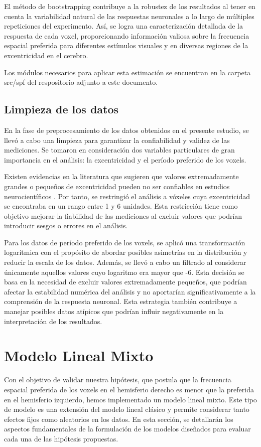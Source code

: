El método de bootstrapping contribuye a la robustez de los resultados al tener en cuenta la variabilidad natural de las respuestas neuronales a lo largo de múltiples repeticiones del experimento. Así, se logra una caracterización detallada de la respuesta de cada voxel, proporcionando información valiosa sobre la frecuencia espacial preferida para diferentes estímulos visuales y en diversas regiones de la excentricidad en el cerebro.

Los m\'odulos necesarios para aplicar esta estimaci\'on se encuentran en la carpeta src/spf del respositorio adjunto a este documento.

\subsection{Limpieza de los datos}

En la fase de preprocesamiento de los datos obtenidos en el presente estudio, se llevó a cabo una limpieza para garantizar la confiabilidad y validez de las mediciones. Se tomaron en consideración dos variables particulares de gran importancia en el análisis: la excentricidad y el período preferido de los voxels.

Existen evidencias en la literatura que sugieren que valores extremadamente grandes o pequeños de excentricidad pueden no ser confiables en estudios neurocientíficos . Por tanto, se restringi\'o el análisis a v\'oxeles cuya excentricidad se encontraba en un rango entre 1 y 6 unidades. Esta restricción tiene como objetivo mejorar la fiabilidad de las mediciones al excluir valores que podrían introducir sesgos o errores en el análisis.

Para los datos de período preferido de los voxels, se aplicó una transformación logarítmica con el propósito de abordar posibles asimetrías en la distribución y reducir la escala de los datos. Además, se llevó a cabo un filtrado al considerar únicamente aquellos valores cuyo logaritmo era mayor que -6. Esta decisión se basa en la necesidad de excluir valores extremadamente pequeños, que podrían afectar la estabilidad numérica del análisis y no aportarían significativamente a la comprensión de la respuesta neuronal. Esta estrategia también contribuye a manejar posibles datos atípicos que podrían influir negativamente en la interpretación de los resultados.

\section{Modelo Lineal Mixto}
\label{mlm}
Con el objetivo de validar nuestra hipótesis, que postula que la frecuencia espacial preferida de los voxels en el hemisferio derecho es menor que la preferida en el hemisferio izquierdo, hemos implementado un modelo lineal mixto. Este tipo de modelo es una extensión del modelo lineal clásico y permite considerar tanto efectos fijos como aleatorios en los datos. En esta sección, se detallarán los aspectos fundamentales de la formulación de los modelos diseñados para evaluar cada una de las hipótesis propuestas.

